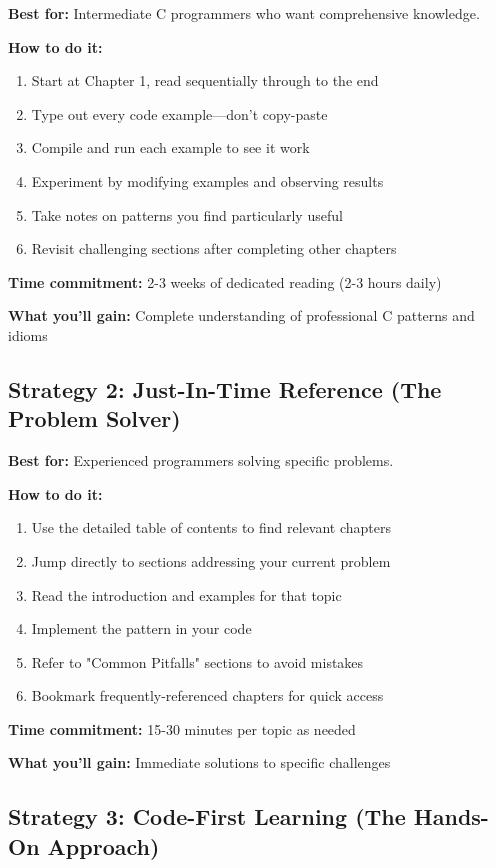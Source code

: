 \documentclass[10pt,openany]{book}
\begin{document}
\textbf{Best for:} Intermediate C programmers who want comprehensive knowledge.

\textbf{How to do it:}
\begin{enumerate}
    \item Start at Chapter 1, read sequentially through to the end
    \item Type out every code example—don't copy-paste
    \item Compile and run each example to see it work
    \item Experiment by modifying examples and observing results
    \item Take notes on patterns you find particularly useful
    \item Revisit challenging sections after completing other chapters
\end{enumerate}

\textbf{Time commitment:} 2-3 weeks of dedicated reading (2-3 hours daily)

\textbf{What you'll gain:} Complete understanding of professional C patterns and idioms

\subsection*{Strategy 2: Just-In-Time Reference (The Problem Solver)}

\textbf{Best for:} Experienced programmers solving specific problems.

\textbf{How to do it:}
\begin{enumerate}
    \item Use the detailed table of contents to find relevant chapters
    \item Jump directly to sections addressing your current problem
    \item Read the introduction and examples for that topic
    \item Implement the pattern in your code
    \item Refer to "Common Pitfalls" sections to avoid mistakes
    \item Bookmark frequently-referenced chapters for quick access
\end{enumerate}

\textbf{Time commitment:} 15-30 minutes per topic as needed

\textbf{What you'll gain:} Immediate solutions to specific challenges

\subsection*{Strategy 3: Code-First Learning (The Hands-On Approach)}
\end{document}
